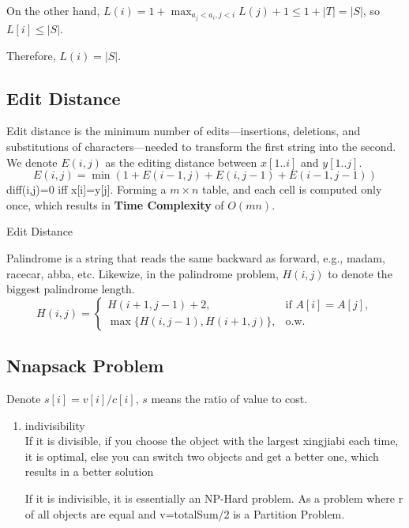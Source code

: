 On the other hand, $L(i)=1+\max_{a_j<a_i,j<i}{L(j)+1}\leq 1+|T|=|S|$, so $L[i]\leq |S|$.

Therefore, $L(i)=|S|$.

\subsection{Edit Distance}
Edit distance is the minimum number of edits—insertions, deletions, and substitutions of characters—needed to transform
the first string into the second.
We denote $E(i,j)$ as the editing distance between $x[1..i]$ and $y[1..j]$.
\[
    E(i,j)=\min(1+E(i-1,j)+E(i,j-1)+E(i-1,j-1))
\]
diff(i,j)=0 iff x[i]=y[j].
Forming a $m \times n$ table, and each cell is computed only once, which results in \textbf{Time Complexity} of $O(mn)$.

\begin{algorithm}
    \caption{Edit Distance}
    \;
\end{algorithm}
Palindrome is a string that reads the same backward as forward, e.g., madam, racecar, abba, etc.
Likewize, in the palindrome problem,
$H(i,j)$ to denote the biggest palindrome length.
\begin{equation}
H(i,j)= 
\begin{cases}
H(i+1,j-1)+2, & \text{if } A[i]=A[j],\\
\max\{H(i,j-1),H(i+1,j)\}, & \text{o.w.}
\end{cases}
\end{equation}

\subsection{Nnapsack Problem}
Denote $s[i]=v[i]/c[i]$, $s$ means the ratio of value to cost.
\begin{enumerate}
    \item indivisibility\\
    If it is divisible, if you choose the object with the largest xingjiabi each time, it is optimal, else you can switch two objects and get a better one, which results in a better solution 

    If it is indivisible, it is essentially an NP-Hard problem. As a problem where r of all objects are equal and v=totalSum/2 is a Partition Problem.
\end{enumerate}

